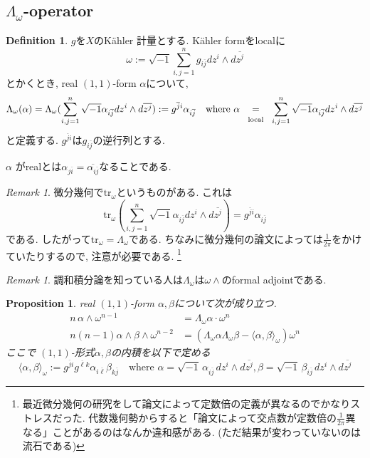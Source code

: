 \documentclass[dvipdfmx,a4paper,11pt]{article} %
\newtheorem{prop}[thm]{Proposition}
\theoremstyle{definition}
\newtheorem{defn}[thm]{Definition}
\theoremstyle{remark}
\newtheorem{rem}[thm]{Remark}
\numberwithin{equation}{section}
\newcommand{\underalign}[2]{\quad \underset{\mathclap{\strut #1}}{#2}\quad}
\begin{document}
\subsection{$\Lambda_{\omega}$-operator}
\begin{defn}
$g$を$X$のKähler 計量とする. Kähler formをlocalに
$$
\omega :=\sqrt{-1}\sum_{i,j=1}^{n}
g_{i\overline{j}}dz^i \wedge d \overline{z^j}
$$
とかくとき, real \((1,1)\)-form $\alpha$について, 
$$
\Lambda_{\omega}(\alpha)
=
\Lambda_{\omega} 
(\sum_{i,j=1}^{n}
\sqrt{-1}
\alpha_{i\overline{j}}
dz^i \wedge d \overline{z^j})
:=g^{\overline{j}i}\alpha_{i \overline{j}}
\quad \text{where } 
\alpha\underalign{\text{local}}{=}\sum_{i,j=1}^{n}
\sqrt{-1}\alpha_{i\overline{j}}
dz^i \wedge d \overline{z^j}
$$
と定義する. $g^{\overline{j}i}$は$g_{i \overline{j}}$の逆行列とする. 
\end{defn}
$\alpha$ がrealとは$\alpha_{j \overline{i}}=\overline{\alpha_{i \overline{j}}}$なることである.  
\begin{rem}
微分幾何で$\mathrm{tr}_{\omega}$というものがある. 
これは
$$
\mathrm{tr}_{\omega}\left(\sum_{i,j=1}^{n}
\sqrt{-1}
\alpha_{i\overline{j}}
dz^i \wedge d \overline{z^j}
 \right) 
 =g^{\overline{j}i}\alpha_{i \overline{j}}
$$
である. したがって$\mathrm{tr}_{\omega}=\Lambda_{\omega}$である.
ちなみに微分幾何の論文によっては$\frac{1}{2\pi}$をかけていたりするので, 注意が必要である. \footnote{最近微分幾何の研究をして論文によって定数倍の定義が異なるのでかなりストレスだった. 代数幾何勢からすると「論文によって交点数が定数倍の$\frac{1}{2\pi}$異なる」ことがあるのはなんか違和感がある. (ただ結果が変わっていないのは流石である)}
\end{rem}

\begin{rem}
調和積分論を知っている人は$\Lambda_{\omega}$は$\omega \wedge$のformal adjointである. 
\end{rem}

\begin{prop}
\label{prop-lambda-formula}
real \((1,1)\)-form $\alpha, \beta$について次が成り立つ. 
\begin{align*}
 n\,\alpha \wedge \omega^{n-1}
&=
\Lambda_\omega \alpha \cdot \omega^n
\\
n (n-1)\alpha \wedge \beta \wedge \omega^{n-2}
&=
\left( \Lambda_{\omega}\alpha\Lambda_{\omega}\beta - \langle \alpha, \beta\rangle_{\omega} \right) \omega^n
\end{align*}
ここで
\((1,1)\)-形式$\alpha, \beta$の内積を以下で定める
\[
\langle \alpha,\beta\rangle_\omega
:=
g^{\overline j i}g^{\overline \ell k}
\alpha_{i\overline \ell}\beta_{k\overline j}
\quad
\text{where }
\alpha
=
\sqrt{-1}\,\alpha_{i\overline j}\,dz^i\wedge d\overline{z^j},
\beta
=
\sqrt{-1}\,\beta_{i\overline j}\,dz^i\wedge d\overline{z^j}
\]
\end{prop}
\end{document}
